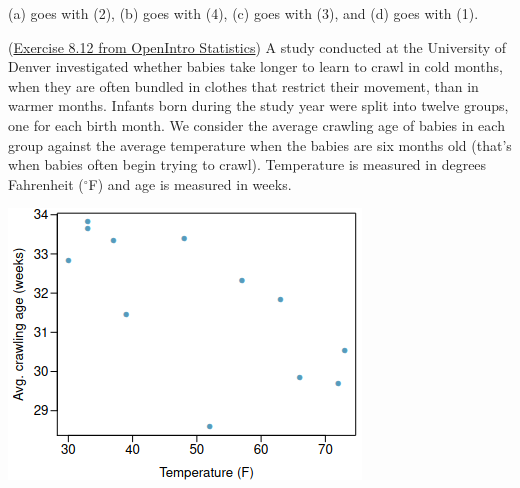 \documentclass[12pt]{exam}
\newcounter{countA}
\begin{document}
\begin{questions}

\begin{solution}
(a) goes with (2), (b) goes with (4), (c) goes with (3), and (d) goes with (1).
\end{solution}
\bigskip

\setcounter{countA}{\value{question}}

\question (\href{http://people.hsc.edu/faculty-staff/blins/books/OpenIntroStats4e.pdf\#eoce.8.12}{Exercise 8.12 from OpenIntro Statistics}) A study conducted at the University of Denver investigated whether babies
take longer to learn to crawl in cold months, when they are often bundled in clothes that restrict their
movement, than in warmer months. Infants born during the study year were split into twelve groups, one
for each birth month. We consider the average crawling age of babies in each group against the average temperature when the babies are six months old (that’s when babies often begin trying to crawl). Temperature
is measured in degrees Fahrenheit ($^\circ$F) and age is measured in weeks.
\begin{center}
\includegraphics[scale=0.6]{babies.png}
\end{center}


\end{questions}
\end{document}
